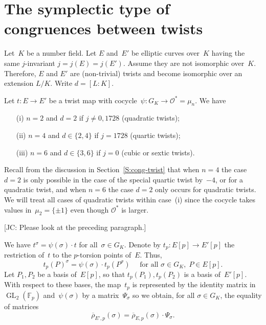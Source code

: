 \documentclass[12pt, reqno]{amsart}
\newcommand{\F}{\mathbb{F}}
\newcommand{\rhobar}{{\overline{\rho}}}
\newcommand{\calO}{\mathcal{O}}
\newcommand{\GL}{\operatorname{GL}}
\numberwithin{equation}{section}
\theoremstyle{definition}
\theoremstyle{remark}
\newcommand{\jc}[1]{{\color{darkgreen} \textsf{[JC: #1]}}}
\begin{document}

\section{The symplectic type of congruences between twists} \label{S:type}

Let~$K$ be a number field. Let $E$ and~$E'$ be elliptic curves over~$K$ having the same $j$-invariant $j = j(E) = j(E')$. Assume they are not 
isomorphic over~$K$. Therefore, $E$ and $E'$ are (non-trivial) twists and become isomorphic over an extension $L/K$. Write $d = [L : K]$. 

Let $t : E \to E'$ be a twist map with 
cocycle~$\psi : G_K \to \calO^* = \mu_n$.
We have 
\begin{itemize}
 \item[(i)] $n=2$ and $d = 2$ if $j  \neq 0, 1728$ (quadratic twists);
 \item[(ii)] $n=4$ and $d \in \{2,4\}$ if $j = 1728$ (quartic twists);
  \item[(iii)] $n=6$ and $d \in \{3,6\}$ if $j = 0$ (cubic or sextic twists).
\end{itemize}

Recall from the discussion in Section~\ref{S:cong-twist} that when
$n=4$ the case $d=2$ is only possible in the case of the special
quartic twist by~$-4$, or for a quadratic twist, and when $n=6$ the
case $d=2$ only occurs for quadratic twists.  We will treat all cases
of quadratic twists within case~(i) since the cocycle takes values
in~$\mu_2=\{\pm1\}$ even though $\calO^*$ is larger.

\jc{Please look at the preceding paragraph.}

We have $t^\sigma = \psi(\sigma) \cdot t$ for all~$\sigma \in G_K$. 
Denote by $t_p : E[p] \to E'[p]$ the restriction of~$t$ to the $p$-torsion points of~$E$. Thus,
\begin{equation}\label{E:cocycle}
   t_p(P)^\sigma = \psi(\sigma) \cdot t_p(P^\sigma) \quad \text{ for all } \sigma \in G_K,
  \; P \in E[p].
\end{equation}
Let $P_1, P_2$ be a basis of~$E[p]$, so that $t_p(P_1), t_p(P_2)$ is a
basis of~$E'[p]$.  With respect to these bases, the map~$t_p$ is
represented by the identity matrix in~$\GL_2(\F_p)$ and~$\psi(\sigma)$
by a matrix~$\Psi_\sigma$ so we obtain, for all $\sigma \in G_K$, the
equality of matrices
\begin{equation} \label{E:PsiMatrix}
 \rhobar_{E',p}(\sigma) = \rhobar_{E,p}(\sigma) \cdot \Psi_\sigma. 
\end{equation}
\end{document}
